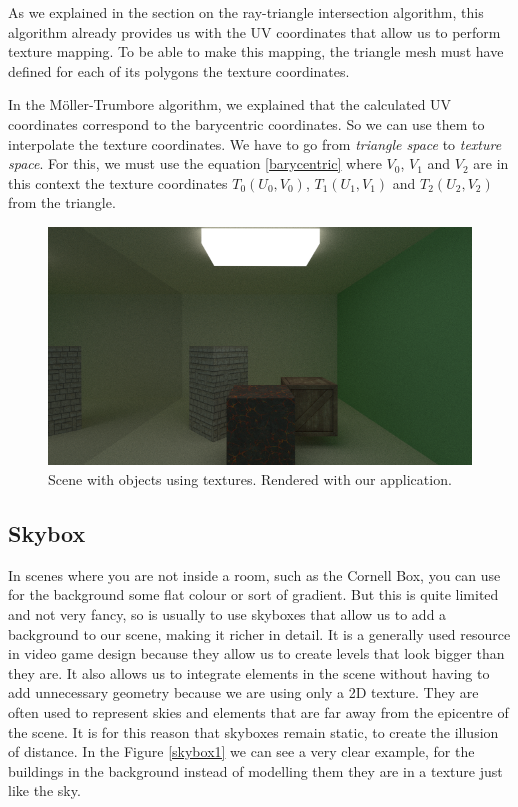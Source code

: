 \documentclass[titlepage,12pt]{report}
\begin{document}
As we explained in the section on the ray-triangle intersection algorithm, this algorithm already provides us with the UV coordinates that allow us to perform texture mapping. To be able to make this mapping, the triangle mesh must have defined for each of its polygons the texture coordinates.

In the Möller-Trumbore algorithm, we explained that the calculated UV coordinates correspond to the barycentric coordinates. So we can use them to interpolate the texture coordinates. We have to go from \textit{triangle space} to \textit{texture space}. For this, we must use the equation \ref{barycentric} where $V_0$, $V_1$ and $V_2$ are in this context the texture coordinates $T_0(U_0, V_0)$, $T_1(U_1, V_1)$ and $T_2(U_2, V_2)$ from the triangle.

\begin{figure}[H]
	\centering
	\includegraphics[scale=0.65]{media/cornell_textures.png}
	\caption{Scene with objects using textures. Rendered with our application.}
	\label{textures_1}
\end{figure}

\subsection{Skybox}

In scenes where you are not inside a room, such as the Cornell Box, you can use for the background some flat colour or sort of gradient. But this is quite limited and not very fancy, so is usually to use skyboxes that allow us to add a background to our scene, making it richer in detail. It is a generally used resource in video game design because they allow us to create levels that look bigger than they are. It also allows us to integrate elements in the scene without having to add unnecessary geometry because we are using only a 2D texture. They are often used to represent skies and elements that are far away from the epicentre of the scene. It is for this reason that skyboxes remain static, to create the illusion of distance. In the Figure \ref{skybox1} we can see a very clear example, for the buildings in the background instead of modelling them they are in a texture just like the sky.
\end{document}
